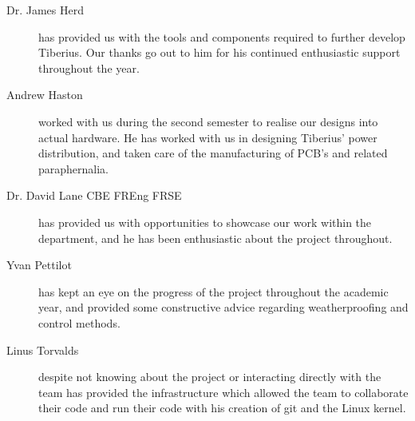 \begin{description}
% 
\item [Dr. James Herd] has provided us with the tools and components required to further develop Tiberius. Our thanks go out to him for his continued enthusiastic support throughout the year.

\item [Andrew Haston] worked with us during the second semester to realise our designs into actual hardware. He has worked with us in designing Tiberius' power distribution, and taken care of the manufacturing of PCB's and related paraphernalia.

\item [Dr. David Lane CBE FREng FRSE] has provided us with opportunities to showcase our work within the department, and he has been enthusiastic about the project throughout.

\item [Yvan Pettilot] has kept an eye on the progress of the project throughout the academic year, and provided some constructive advice regarding weatherproofing and control methods.

\item [Linus Torvalds] despite not knowing about the project or interacting directly with the team has provided the infrastructure which allowed the team to collaborate their code and run their code with his creation of git and the Linux kernel.


\end{description}

